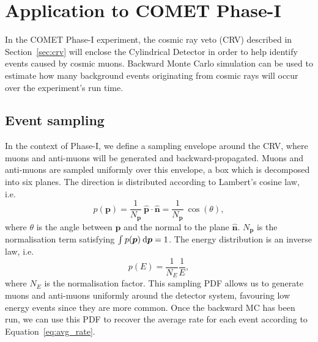 \section{Application to COMET Phase-I}
In the COMET Phase-I experiment, the cosmic ray veto (CRV) described in
Section~\ref{sec:crv} will enclose the Cylindrical Detector in order to help
identify events caused by cosmic muons. Backward Monte Carlo simulation can be
used to estimate how many background events originating from cosmic rays will
occur over the experiment's run time. 

\subsection{Event sampling}
In the context of Phase-I, we define a sampling envelope around the CRV, where
muons and anti-muons will be generated and backward-propagated. Muons and
anti-muons are sampled uniformly over this envelope, a box which is decomposed
into six planes. The direction is distributed according to Lambert's cosine law,
i.e.\ 
$$
p(\bm{p}) = 
    \frac{1}{N_{\bm{p}}} \ \hat{\bm{p}} \cdot \hat{\bm{n}} = 
    \frac{1}{N_{\bm{p}}}\:\cos(\theta),
$$
where $\theta$ is the angle between $\bm{p}$ and the normal to the plane
$\hat{\bm{n}}$. $N_{\bm{p}}$ is the normalisation term satisfying 
$\int p(\bm{p}) \: \textnormal{d}\bm{p} = 1$.
The energy distribution is an inverse law, i.e.\ 
$$
p(E) = \frac{1}{N_E}  \frac{1}{E},
$$
where $N_E$ is the normalisation factor. 
This sampling PDF allows us to generate muons and anti-muons uniformly around the
detector system, favouring low energy events since they are more common. Once
the backward MC has been run, we can use this PDF to recover the average rate
for each event according to Equation~\ref{eq:avg_rate}.

